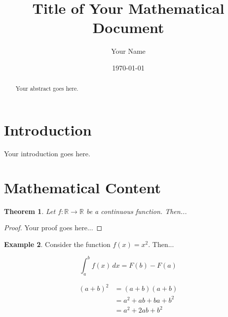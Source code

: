 \documentclass[11pt,a4paper]{article}
\theoremstyle{plain}
\newtheorem{theorem}{Theorem}[section]
\theoremstyle{definition}
\newtheorem{example}[theorem]{Example}
\newcommand{\R}{\mathbb{R}}        %
\begin{document}
\title{Title of Your Mathematical Document}
\author{Your Name}
\date{\today}

\maketitle

\begin{abstract}
Your abstract goes here.
\end{abstract}

\section{Introduction}
Your introduction goes here.

\section{Mathematical Content}
\begin{theorem}
    Let $f: \R \to \R$ be a continuous function. Then...
\end{theorem}

\begin{proof}
    Your proof goes here...
\end{proof}

\begin{example}
    Consider the function $f(x) = x^2$. Then...
\end{example}

\begin{equation}
    \int_a^b f(x)\,dx = F(b) - F(a)
\end{equation}

\begin{align}
    (a + b)^2 &= (a + b)(a + b) \\
    &= a^2 + ab + ba + b^2 \\
    &= a^2 + 2ab + b^2
\end{align}
\end{document}

